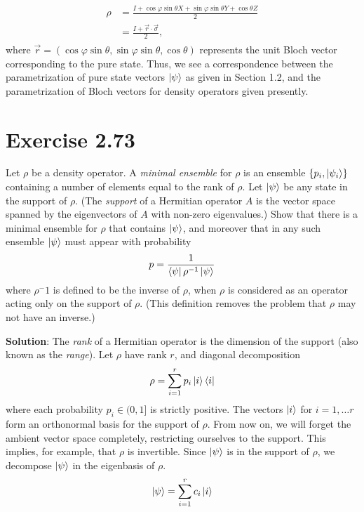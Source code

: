 \documentclass{book}
\begin{document}
    \begin{align}
    \begin{aligned}
        \rho &= \frac{I + \cos\varphi \sin\theta X + \sin\varphi\sin\theta Y + \cos\theta Z}{2} \\
        &= \frac{I + \vec{r}\cdot \vec{\sigma}}{2},
    \end{aligned}
    \end{align}
    where $\vec{r} = (\cos\varphi \sin\theta, \sin\varphi\sin\theta, \cos\theta)$ represents the unit Bloch vector corresponding to the pure state. Thus, we see a correspondence between the parametrization of pure state vectors $\ket{\psi}$ as given in Section 1.2, and the parametrization of Bloch vectors for density operators given presently.

\section*{Exercise 2.73}
    Let $\rho$ be a density operator. A \emph{minimal ensemble} for $\rho$ is an ensemble $\{p_i, \ket{\psi_i}\}$ containing a number of elements equal to the rank of $\rho$. Let $\ket{\psi}$ be any state in the support of $\rho$. (The \emph{support} of a Hermitian operator $A$ is the vector space spanned by the eigenvectors of $A$ with non-zero eigenvalues.) Show that there is a minimal ensemble for $\rho$ that contains $\ket{\psi}$, and moreover that in any such ensemble $\ket{\psi}$ must appear with probability
    \begin{align}
        p = \frac{1}{\bra{\psi}\rho^{-1} \ket{\psi}}
    \end{align}
    where $\rho^-1$ is defined to be the inverse of $\rho$, when $\rho$ is considered as an operator acting only on the support of $\rho$. (This definition removes the problem that $\rho$ may not have an inverse.)

    \textbf{Solution}: The \emph{rank} of a Hermitian operator is the dimension of the support (also known as the \emph{range}). Let $\rho$ have rank $r$, and diagonal decomposition
    \begin{align}
        \rho = \sum_{i=1}^r p_i \ket{i}\bra{i}
    \end{align}
    where each probability $p_i \in (0,1]$ is strictly positive. The vectors $\ket{i}$ for $i = 1,\dots r$ form an orthonormal basis for the support of $\rho$. From now on, we will forget the ambient vector space completely, restricting ourselves to the support. This implies, for example, that $\rho$ is invertible. Since $\ket{\psi}$ is in the support of $\rho$, we decompose $\ket{\psi}$ in the eigenbasis of $\rho$.
    \begin{align} \label{eq:2.73_basis}
        \ket{\psi} = \sum_{i=1}^r c_i \ket{i}
    \end{align}
\end{document}
